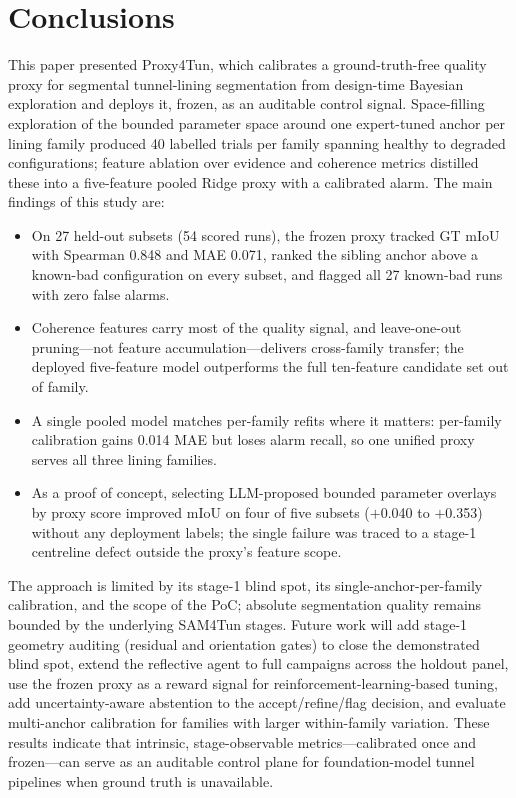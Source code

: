 \documentclass[a4paper,fleqn]{cas-dc}
\begin{document}
\section{Conclusions}\label{sec:conclusions}

This paper presented Proxy4Tun, which calibrates a ground-truth-free quality proxy for segmental tunnel-lining segmentation from design-time Bayesian exploration and deploys it, frozen, as an auditable control signal. Space-filling exploration of the bounded parameter space around one expert-tuned anchor per lining family produced 40 labelled trials per family spanning healthy to degraded configurations; feature ablation over evidence and coherence metrics distilled these into a five-feature pooled Ridge proxy with a calibrated alarm. The main findings of this study are:

\begin{itemize}
\item On 27 held-out subsets (54 scored runs), the frozen proxy tracked GT mIoU with Spearman 0.848 and MAE 0.071, ranked the sibling anchor above a known-bad configuration on every subset, and flagged all 27 known-bad runs with zero false alarms.
\item Coherence features carry most of the quality signal, and leave-one-out pruning---not feature accumulation---delivers cross-family transfer; the deployed five-feature model outperforms the full ten-feature candidate set out of family.
\item A single pooled model matches per-family refits where it matters: per-family calibration gains 0.014 MAE but loses alarm recall, so one unified proxy serves all three lining families.
\item As a proof of concept, selecting LLM-proposed bounded parameter overlays by proxy score improved mIoU on four of five subsets ($+$0.040 to $+$0.353) without any deployment labels; the single failure was traced to a stage-1 centreline defect outside the proxy's feature scope.
\end{itemize}

The approach is limited by its stage-1 blind spot, its single-anchor-per-family calibration, and the scope of the PoC; absolute segmentation quality remains bounded by the underlying SAM4Tun stages. Future work will add stage-1 geometry auditing (residual and orientation gates) to close the demonstrated blind spot, extend the reflective agent to full campaigns across the holdout panel, use the frozen proxy as a reward signal for reinforcement-learning-based tuning, add uncertainty-aware abstention to the accept/refine/flag decision, and evaluate multi-anchor calibration for families with larger within-family variation. These results indicate that intrinsic, stage-observable metrics---calibrated once and frozen---can serve as an auditable control plane for foundation-model tunnel pipelines when ground truth is unavailable.
\end{document}
